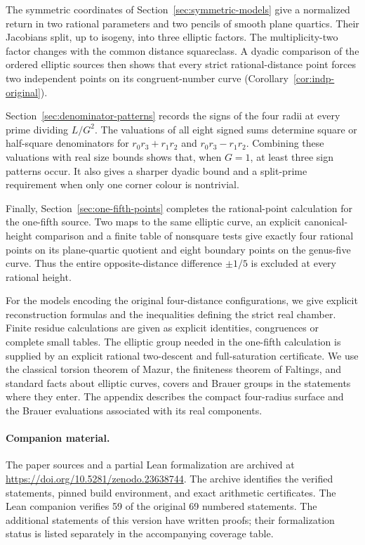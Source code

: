 The symmetric coordinates of Section~\ref{sec:symmetric-models} give a
normalized return in two rational parameters and two pencils of smooth
plane quartics. Their Jacobians split, up to isogeny, into three elliptic
factors. The multiplicity-two factor changes with the common distance
squareclass. A dyadic comparison of the ordered elliptic sources then
shows that every strict rational-distance point forces two independent
points on its congruent-number curve
(Corollary~\ref{cor:indp-original}).

Section~\ref{sec:denominator-patterns} records the signs of the four
radii at every prime dividing $L/G^2$. The valuations of all eight signed
sums determine square or half-square denominators for
$r_0r_3+r_1r_2$ and $r_0r_3-r_1r_2$. Combining these valuations with real
size bounds shows that, when $G=1$, at least three sign patterns occur.
It also gives a sharper dyadic bound and a split-prime requirement when
only one corner colour is nontrivial.

Finally, Section~\ref{sec:one-fifth-points} completes the rational-point
calculation for the one-fifth source. Two maps to the same elliptic curve,
an explicit canonical-height comparison and a finite table of nonsquare
tests give exactly four rational points on its plane-quartic quotient
and eight boundary points on the genus-five curve. Thus the entire
opposite-distance difference $\pm1/5$ is excluded at every rational height.

For the models encoding the original four-distance configurations, we give
explicit reconstruction formulas and the inequalities defining the strict
real chamber. Finite residue calculations
are given as explicit identities, congruences or complete small tables.
The elliptic group needed in the one-fifth calculation is supplied by an
explicit rational two-descent and full-saturation certificate. We use the
classical torsion theorem of Mazur, the finiteness theorem of
Faltings, and standard facts about elliptic curves, covers and Brauer groups
in the statements where they enter. The appendix describes the compact
four-radius surface and the Brauer evaluations associated with its real
components.

\paragraph{Companion material.}
The paper sources and a partial Lean formalization are archived at
\url{https://doi.org/10.5281/zenodo.23638744}.
The archive identifies the verified statements, pinned build environment,
and exact arithmetic certificates. The Lean companion verifies 59 of the
original 69 numbered statements. The additional statements of this
version have written proofs; their formalization status is listed
separately in the accompanying coverage table.
